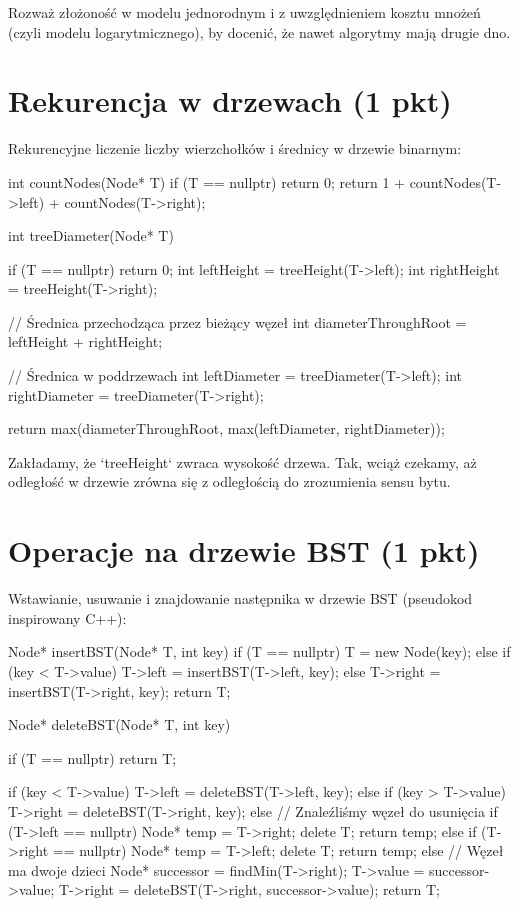 \documentclass[12pt]{article}
\begin{document}
Rozważ złożoność w modelu jednorodnym i z uwzględnieniem kosztu mnożeń 
(czyli modelu logarytmicznego), by docenić, że nawet algorytmy mają 
drugie dno.

\section{Rekurencja w drzewach (1 pkt)}
Rekurencyjne liczenie liczby wierzchołków i średnicy w drzewie binarnym:

\begin{cppcode}
int countNodes(Node* T) {
    if (T == nullptr) 
        return 0;
    return 1 + countNodes(T->left) + countNodes(T->right);
}
\end{cppcode}

\begin{cppcode}
int treeDiameter(Node* T) {
    if (T == nullptr) 
        return 0;
    int leftHeight  = treeHeight(T->left);
    int rightHeight = treeHeight(T->right);

    // Średnica przechodząca przez bieżący węzeł
    int diameterThroughRoot = leftHeight + rightHeight;

    // Średnica w poddrzewach
    int leftDiameter  = treeDiameter(T->left);
    int rightDiameter = treeDiameter(T->right);

    return max(diameterThroughRoot, max(leftDiameter, rightDiameter));
}
\end{cppcode}

Zakładamy, że `treeHeight` zwraca wysokość drzewa.  
Tak, wciąż czekamy, aż odległość w drzewie zrówna się z odległością 
do zrozumienia sensu bytu.

\section{Operacje na drzewie BST (1 pkt)}
Wstawianie, usuwanie i znajdowanie następnika w drzewie BST (pseudokod inspirowany C++):

\begin{cppcode}
Node* insertBST(Node* T, int key) {
    if (T == nullptr) {
        T = new Node(key);
    } else if (key < T->value) {
        T->left = insertBST(T->left, key);
    } else {
        T->right = insertBST(T->right, key);
    }
    return T;
}
\end{cppcode}

\begin{cppcode}
Node* deleteBST(Node* T, int key) {
    if (T == nullptr) 
        return T;
    
    if (key < T->value) {
        T->left = deleteBST(T->left, key);
    } else if (key > T->value) {
        T->right = deleteBST(T->right, key);
    } else {
        // Znaleźliśmy węzeł do usunięcia
        if (T->left == nullptr) {
            Node* temp = T->right;
            delete T;
            return temp;
        } else if (T->right == nullptr) {
            Node* temp = T->left;
            delete T;
            return temp;
        } else {
            // Węzeł ma dwoje dzieci
            Node* successor = findMin(T->right);
            T->value = successor->value;
            T->right = deleteBST(T->right, successor->value);
        }
    }
    return T;
}
\end{cppcode}
\end{document}

